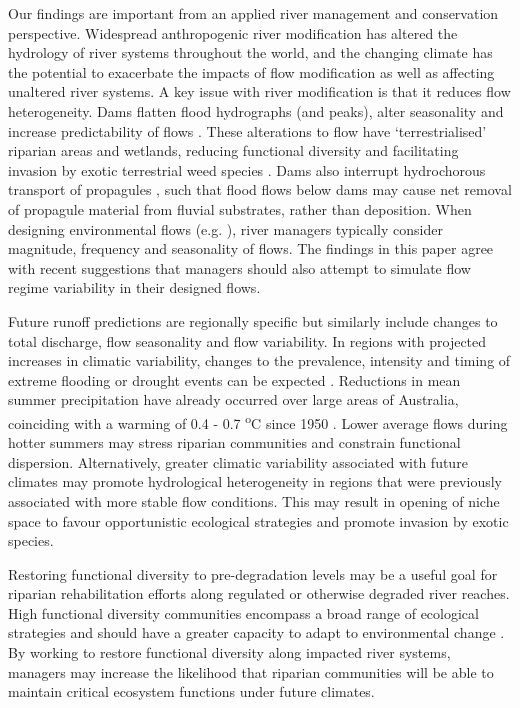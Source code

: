 \documentclass[12pt,a4paper]{memoir}
\begin{document}
Our findings are important from an applied river management and conservation perspective. Widespread anthropogenic river modification has altered the hydrology of river systems throughout the world, and the changing climate has the potential to exacerbate the impacts of flow modification as well as affecting unaltered river systems. A key issue with river modification is that it reduces flow heterogeneity. Dams flatten flood hydrographs (and peaks), alter seasonality and increase predictability of flows \citep{Graf2006, Singer2007}. These alterations to flow have ‘terrestrialised’ riparian areas and wetlands, reducing functional diversity and facilitating invasion by exotic terrestrial weed species \citep{Catford2011}.  Dams also interrupt hydrochorous transport of propagules \citep{Merritt2010a}, such that flood flows below dams may cause net removal of propagule material from fluvial substrates, rather than deposition. When designing environmental flows (e.g. \citet{Howell2000}), river managers typically consider magnitude, frequency and seasonality of flows. The findings in this paper agree with recent suggestions \citep{Naiman2008} that managers should also attempt to simulate flow regime variability in their designed flows.
 
Future runoff predictions are regionally specific but similarly include changes to total discharge, flow seasonality and flow variability. In regions with projected increases in climatic variability, changes to the prevalence, intensity and timing of extreme flooding or drought events can be expected \citep{Hennessy2008}. Reductions in mean summer precipitation have already occurred over large areas of Australia, coinciding with a warming of 0.4 - 0.7 \textsuperscript{o}C since 1950 \citep{Hennessy2007}. Lower average flows during hotter summers may stress riparian communities and constrain functional dispersion. Alternatively, greater climatic variability associated with future climates \citep{Hennessy2008} may promote hydrological heterogeneity in regions that were previously associated with more stable flow conditions. This may result in opening of niche space to favour opportunistic ecological strategies and promote invasion by exotic species.
 
Restoring functional diversity to pre-degradation levels may be a useful goal for riparian rehabilitation efforts along regulated or otherwise degraded river reaches. High functional diversity communities encompass a broad range of ecological strategies and should have a greater capacity to adapt to environmental change \citep{Tilman1997, Standish2014}. By working to restore functional diversity along impacted river systems, managers may increase the likelihood that riparian communities will be able to maintain critical ecosystem functions under future climates.
 
\end{document}
